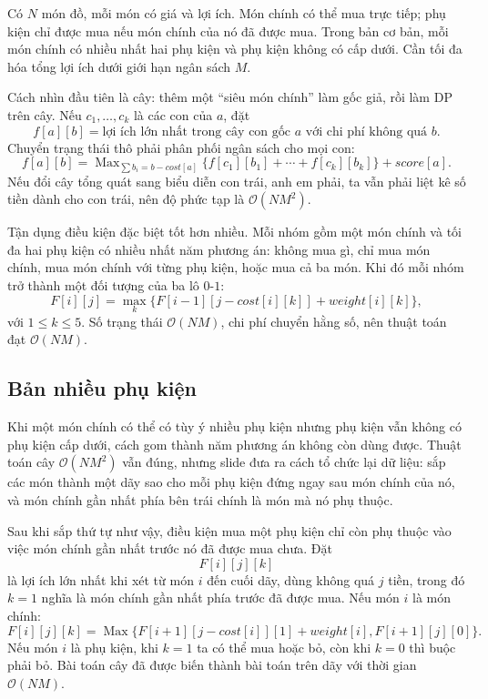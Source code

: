 \documentclass[11pt]{article}
\newcommand{\Oh}{\mathcal{O}}
\newcommand{\Max}{\operatorname{Max}}
\begin{document}
Có \(N\) món đồ, mỗi món có giá và lợi ích. Món chính có thể mua trực tiếp;
phụ kiện chỉ được mua nếu món chính của nó đã được mua. Trong bản cơ bản,
mỗi món chính có nhiều nhất hai phụ kiện và phụ kiện không có cấp dưới. Cần
tối đa hóa tổng lợi ích dưới giới hạn ngân sách \(M\).

Cách nhìn đầu tiên là cây: thêm một ``siêu món chính'' làm gốc giả, rồi làm
DP trên cây. Nếu \(c_1,\ldots,c_k\) là các con của \(a\), đặt
\[
  f[a][b]=\text{lợi ích lớn nhất trong cây con gốc }a
  \text{ với chi phí không quá }b.
\]
Chuyển trạng thái thô phải phân phối ngân sách cho mọi con:
\[
  f[a][b]=
  \Max_{\sum b_i=b-\mathit{cost}[a]}
  \{f[c_1][b_1]+\cdots+f[c_k][b_k]\}+\mathit{score}[a].
\]
Nếu đổi cây tổng quát sang biểu diễn con trái, anh em phải, ta vẫn phải liệt
kê số tiền dành cho con trái, nên độ phức tạp là \(\Oh(NM^2)\).

Tận dụng điều kiện đặc biệt tốt hơn nhiều. Mỗi nhóm gồm một món chính và tối
đa hai phụ kiện có nhiều nhất năm phương án: không mua gì, chỉ mua món chính,
mua món chính với từng phụ kiện, hoặc mua cả ba món. Khi đó mỗi nhóm trở
thành một đối tượng của ba lô \(0\)-\(1\):
\[
  F[i][j]=
  \max_k\{F[i-1][j-\mathit{cost}[i][k]]
       +\mathit{weight}[i][k]\},
\]
với \(1\le k\le 5\). Số trạng thái \(\Oh(NM)\), chi phí chuyển hằng số, nên
thuật toán đạt \(\Oh(NM)\).

\subsection{Bản nhiều phụ kiện}

Khi một món chính có thể có tùy ý nhiều phụ kiện nhưng phụ kiện vẫn không có
phụ kiện cấp dưới, cách gom thành năm phương án không còn dùng được. Thuật
toán cây \(\Oh(NM^2)\) vẫn đúng, nhưng slide đưa ra cách tổ chức lại dữ liệu:
sắp các món thành một dãy sao cho mỗi phụ kiện đứng ngay sau món chính của
nó, và món chính gần nhất phía bên trái chính là món mà nó phụ thuộc.

Sau khi sắp thứ tự như vậy, điều kiện mua một phụ kiện chỉ còn phụ thuộc vào
việc món chính gần nhất trước nó đã được mua chưa. Đặt
\[
  F[i][j][k]
\]
là lợi ích lớn nhất khi xét từ món \(i\) đến cuối dãy, dùng không quá \(j\)
tiền, trong đó \(k=1\) nghĩa là món chính gần nhất phía trước đã được mua.
Nếu món \(i\) là món chính:
\[
  F[i][j][k]=
  \Max\{F[i+1][j-\mathit{cost}[i]][1]+\mathit{weight}[i],
        F[i+1][j][0]\}.
\]
Nếu món \(i\) là phụ kiện, khi \(k=1\) ta có thể mua hoặc bỏ, còn khi \(k=0\)
thì buộc phải bỏ. Bài toán cây đã được biến thành bài toán trên dãy với thời
gian \(\Oh(NM)\).
\end{document}
